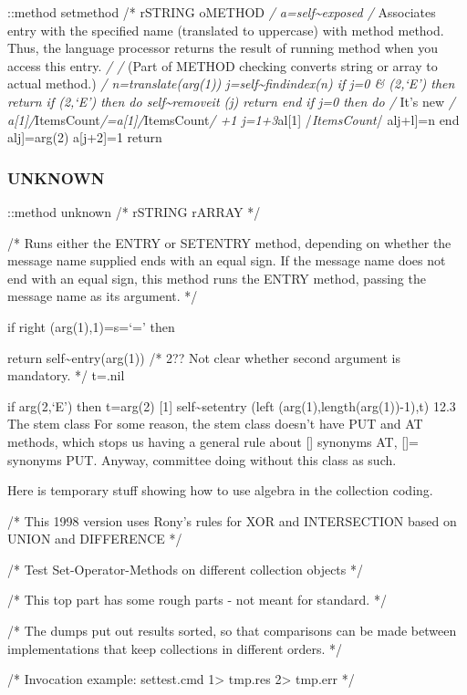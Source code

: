 ::method setmethod /* rSTRING oMETHOD \emph{/
a=self\textasciitilde exposed /} Associates entry with the specified
name (translated to uppercase) with method method. Thus, the language
processor returns the result of running method when you access this
entry. \emph{/ /} (Part of METHOD checking converts string or array to
actual method.) \emph{/ n=translate(arg(1))
j=self\textasciitilde findindex(n) if j=0 \& \arg(2,`E') then return if
\arg(2,`E') then do self\textasciitilde removeit (j) return end if j=0
then do /} It's new \emph{/
a{[}1{]}/}ItemsCount\emph{/=a{[}1{]}/}ItemsCount\emph{/ +1
j=1+3}al{[}1{]} /\emph{ItemsCount}/ alj+l{]}=n end alj{]}=arg(2)
a{[}j+2{]}=1 return

\hypertarget{unknown}{%
\subsubsection{UNKNOWN}\label{unknown}}

::method unknown /* rSTRING rARRAY */

/* Runs either the ENTRY or SETENTRY method, depending on whether the
message name supplied ends with an equal sign. If the message name does
not end with an equal sign, this method runs the ENTRY method, passing
the message name as its argument. */

if right (arg(1),1)=s=`=' then

return self\textasciitilde entry(arg(1)) /* 2?? Not clear whether second
argument is mandatory. */ t=.nil

if arg(2,`E') then t=arg(2) {[}1{]} self\textasciitilde setentry (left
(arg(1),length(arg(1))-1),t) 12.3 The stem class For some reason, the
stem class doesn't have PUT and AT methods, which stops us having a
general rule about {[}{]} synonyms AT, {[}{]}= synonyms PUT. Anyway,
committee doing without this class as such.

Here is temporary stuff showing how to use algebra in the collection
coding.

/* This 1998 version uses Rony's rules for XOR and INTERSECTION based on
UNION and DIFFERENCE */

/* Test Set-Operator-Methods on different collection objects */

/* This top part has some rough parts - not meant for standard. */

/* The dumps put out results sorted, so that comparisons can be made
between implementations that keep collections in different orders. */

/* Invocation example: settest.cmd 1\textgreater{} tmp.res
2\textgreater{} tmp.err */

